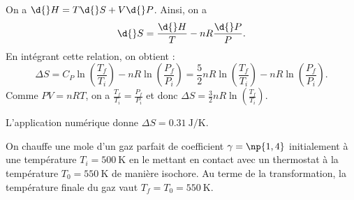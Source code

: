 
\begin{corrige}
On a $\d{}H=T\d{}S+V\d{}P$. Ainsi, on a 
\[
\d{}S=\frac{\d{}H}{T}-nR\frac{\d{}P}{P}.
\]
En intégrant cette relation, on obtient : 
\[
\Delta S
=C_P\ln\left(\frac{T_f}{T_i}\right)-nR\ln\left(\frac{P_f}{P_i}\right)
=\frac{5}{2}nR\ln\left(\frac{T_f}{T_i}\right)-nR\ln\left(\frac{P_f}{P_i}\right).
\]
Comme $PV = nRT$, on a $\frac{T_f}{T_i} = \frac{P_f}{P_i}$ et donc $\Delta S = \frac{3}{2}nR\ln\left(\frac{T_f}{T_i}\right)$.

L'application numérique donne $\Delta S=\SI{0,31}{\joule\per\kelvin}$.
\end{corrige}


\finEntrainement







\hauteurLargeurCadreReponse		{7mm}{3.75cm}
\initialisationEntrainement
 
On chauffe une mole d'un gaz parfait de coefficient $\gamma=\np{1,4}$ initialement à une température $T_i=\SI{500}{\kelvin}$ en le mettant en contact avec un thermostat à la température $T_0=\SI{550}{\kelvin}$ de manière isochore. Au terme de la transformation, la température finale du gaz vaut $T_f=T_0=\SI{550}{\kelvin}$. 
\smallskip
 
\debutEntrainement
 

